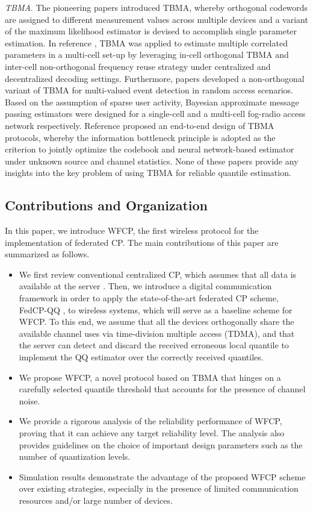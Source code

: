 \documentclass[12pt, draftclsnofoot, onecolumn]{IEEEtran}
\begin{document}
\emph{TBMA}. The pioneering papers \cite{Tong_TBMA, Liu_TBMA} introduced TBMA, whereby orthogonal codewords are assigned to different measurement values across multiple devices and a variant of the maximum likelihood estimator is devised to accomplish single parameter estimation. In reference \cite{multi_cell_FRAN}, TBMA was applied to estimate multiple correlated parameters in a multi-cell set-up by leveraging in-cell orthogonal TBMA and inter-cell non-orthogonal frequency reuse strategy under centralized and decentralized decoding settings. Furthermore, papers \cite{single_cell_codebook,multi_cell_codebook} developed a non-orthogonal variant of TBMA for multi-valued event detection in random access scenarios. Based on the assumption of sparse user activity, Bayesian approximate message passing estimators were designed for a single-cell \cite{single_cell_codebook} and a multi-cell fog-radio access network \cite{multi_cell_codebook} respectively. Reference \cite{zhu2023information} proposed an end-to-end design of TBMA protocols, whereby the information bottleneck principle is adopted as the criterion to jointly optimize the codebook and neural network-based estimator under unknown source and channel statistics. None of these papers provide any insights into the key problem of using TBMA for reliable quantile estimation.

\subsection{Contributions and Organization}
In this paper, we introduce WFCP, the first wireless protocol for the implementation of federated CP. The main contributions of this paper are summarized as follows.
\begin{itemize}
  \item We first review conventional centralized CP, which assumes that all data is available at the server \cite{vovk2005algorithmic}. Then, we introduce a digital communication framework in order to apply the state-of-the-art federated CP scheme, FedCP-QQ \cite{FedCP-QQ}, to wireless systems, which will serve as a baseline scheme for WFCP. To this end, we assume that all the devices orthogonally share the available channel uses via time-division multiple access (TDMA), and that the server can detect and discard the received erroneous local quantile to implement the QQ estimator over the correctly received quantiles.
  \item We propose WFCP, a novel protocol based on TBMA that hinges on a carefully selected quantile threshold that accounts for the presence of channel noise.
  \item We provide a rigorous analysis of the reliability performance of WFCP, proving that it can achieve any target reliability level. The analysis also provides guidelines on the choice of important design parameters such as the number of quantization levels.
  \item Simulation results demonstrate the advantage of the proposed WFCP scheme over existing strategies, especially in the presence of limited communication resources and/or large number of devices. 
\end{itemize}
\end{document}
